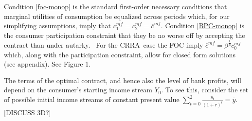 \documentclass[11pt]{article}%
\begin{document}
Condition \ref{foc-monop} is the standard first-order necessary conditions
that marginal utilities of consumption be equalized across periods which, for our simplifying assumptions, imply that  $c_{1}^{mf}=c_{2}^{mf}=\overline{c}^{mf}$. Condition \ref{BPC-monop} is the consumer participation constraint that they
be no worse off by accepting the contract than under autarky. \ For the
CRRA\ case the FOC  imply $\overline{c}^{mf}=\beta^{\frac
{1}{\rho}}c_{0}^{mf}$ which, along with the participation constraint, allow for closed form solutions (see appendix). See Figure 1.

The terms of the optimal contract, and hence also the level of bank profits, will  depend on the consumer's starting income stream \(Y_{0}\).   To see this, consider the set of possible initial income streams of constant present value   $\sum_{t=0}^{2}\frac{y_{t}}{(1+r)^{t}}=\bar{y}$. [DISCUSS 3D?]
 
\end{document}
